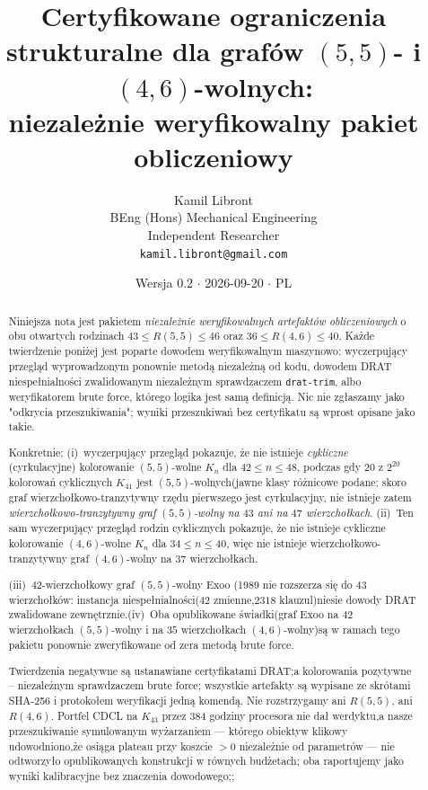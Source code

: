\documentclass[11pt]{article}
\title{Certyfikowane ograniczenia strukturalne dla grafów $(5,5)$- i $(4,6)$-wolnych:\\
niezależnie weryfikowalny pakiet obliczeniowy}
\author{Kamil Libront\\[2pt]
\small BEng (Hons) Mechanical Engineering\\
\small Independent Researcher\\
\small \texttt{kamil.libront@gmail.com}
}
\date{Wersja 0.2 $\cdot$ 2026-09-20 $\cdot$ PL}
\theoremstyle{definition}
\theoremstyle{plain}
\newcommand{\K}{\ensuremath{K}}
\newcommand{\R}[2]{\ensuremath{R(#1,#2)}}
\begin{document}
\maketitle

\begin{abstract}
Niniejsza nota jest pakietem \emph{niezależnie weryfikowalnych artefaktów obliczeniowych} o obu otwartych rodzinach $43 \le \R{5}{5} \le 46$ oraz $36 \le \R{4}{6} \le 40$. Każde twierdzenie poniżej jest poparte dowodem weryfikowalnym maszynowo: wyczerpujący przegląd wyprowadzonym ponownie metodą niezależną od kodu, dowodem DRAT niespełnialności zwalidowanym niezależnym sprawdzaczem \texttt{drat-trim}, albo weryfikatorem brute force, którego logika jest samą definicją. Nic nie zgłaszamy jako "odkrycia przeszukiwania"; wyniki przeszukiwań bez certyfikatu są wprost opisane jako takie.



Konkretnie: (i)~wyczerpujący przegląd pokazuje, że nie istnieje \emph{cykliczne} (cyrkulacyjne) kolorowanie $(5,5)$-wolne $\K_n$ dla $42 \le n \le 48$, podczas gdy $20$ z $2^{20}$ kolorowań cyklicznych $\K_{41}$ jest $(5,5)$-wolnych(jawne klasy różnicowe podane; skoro graf wierzchołkowo-tranzytywny rzędu pierwszego jest cyrkulacyjny, nie istnieje zatem \emph{wierzchołkowo-tranzytywny graf $(5,5)$-wolny na $43$ ani na $47$ wierzchołkach}. (ii)~Ten sam wyczerpujący przegląd rodzin cyklicznych pokazuje, że nie istnieje cykliczne kolorowanie $(4,6)$-wolne $\K_n$ dla $34 \le n \le 40$, więc nie istnieje wierzchołkowo-tranzytywny graf $(4,6)$-wolny na $37$ wierzchołkach.

(iii)~$42$-wierzchołkowy graf $(5,5)$-wolny Exoo (1989 nie rozszerza się do $43$ wierzchołków: instancja niespełnialności($42$ zmienne,$2318$ klauzul)niesie dowody DRAT zwalidowane zewnętrznie.(iv)~Oba opublikowane świadki(graf Exoo na $42$ wierzchołkach $(5,5)$-wolny i na $35$ wierzchołkach $(4,6)$-wolny)są w ramach tego pakietu ponownie zweryfikowane od zera metodą brute force.



Twierdzenia negatywne są ustanawiane certyfikatami DRAT;a kolorowania pozytywne -- niezależnym sprawdzaczem brute force; wszystkie artefakty są wypisane ze skrótami SHA-256 i protokołem weryfikacji jedną komendą. Nie rozstrzygamy ani $\R{5}{5}$, ani $\R{4}{6}$. Portfel CDCL na $\K_{43}$ przez $384$ godziny procesora nie dał werdyktu,a nasze przeszukiwanie symulowanym wyżarzaniem --- którego obiektyw klikowy udowodniono,że osiąga plateau przy koszcie $>0$ niezależnie od parametrów --- nie odtworzyło opublikowanych konstrukcji w równych budżetach; oba raportujemy jako wyniki kalibracyjne bez znaczenia dowodowego;;

\end{abstract}
\end{document}
